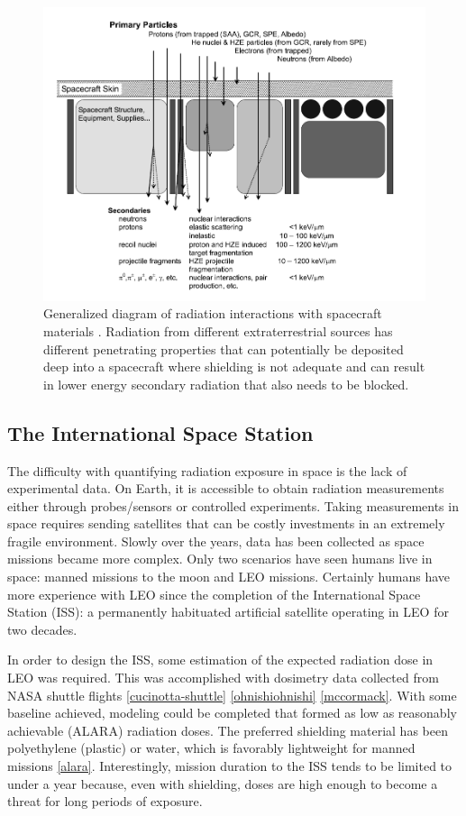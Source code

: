 \begin{figure}
\centering
\includegraphics[width=\linewidth]{shield_transport.png}
\caption{Generalized diagram of radiation interactions with spacecraft materials \cite{bentonbenton}. Radiation from different extraterrestrial sources has different penetrating properties that can potentially be deposited deep into a spacecraft where shielding is not adequate and can result in lower energy secondary radiation that also needs to be blocked.}
\label{fig:shield-transport }
\end{figure}

\subsection{The International Space Station}

The difficulty with quantifying radiation exposure in space is the lack of experimental data. On Earth, it is accessible to obtain radiation measurements either through probes/sensors or controlled experiments. Taking measurements in space requires sending satellites that can be costly investments in an extremely fragile environment. Slowly over the years, data has been collected as space missions became more complex. Only two scenarios have seen humans live in space: manned missions to the moon and LEO missions. Certainly humans have more experience with LEO since the completion of the International Space Station (ISS): a permanently habituated artificial satellite operating in LEO for two decades.

In order to design the ISS, some estimation of the expected radiation dose in LEO was required. This was accomplished with dosimetry data collected from NASA shuttle flights \ref{cucinotta-shuttle} \ref{ohnishiohnishi} \ref{mccormack}. With some baseline achieved, modeling could be completed that formed as low as reasonably achievable (ALARA) radiation doses. The preferred shielding material has been polyethylene (plastic) or water, which is favorably lightweight for manned missions \ref{alara}. Interestingly, mission duration to the ISS tends to be limited to under a year because, even with shielding, doses are high enough to become a threat for long periods of exposure.

